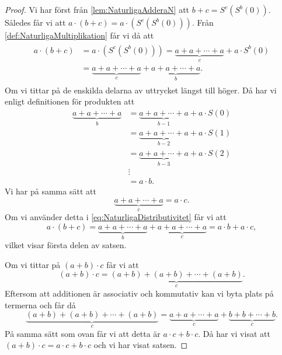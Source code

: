 \begin{proof}
  Vi har först från \cref{lem:NaturligaAdderaN} att \(b+c=S^c(S^b(0))\).
  Således får vi att \(a\cdot (b+c) = a\cdot (S^c(S^b(0)))\).
  Från \cref{def:NaturligaMultiplikation} får vi då att
  \begin{align}
    \label{eq:NaturligaDistributivitet}
    \begin{split}
      a\cdot (b+c) &= a\cdot (S^c(S^b(0))) = \underbrace{a+a+\cdots+a}_{c} +
        a\cdot S^b(0) \\
        &= \underbrace{a+a+\cdots+a}_{c}+\underbrace{a+a+\cdots+a}_{b}.
    \end{split}
  \end{align}
  Om vi tittar på de enskilda delarna av uttrycket längst till höger.
  Då har vi enligt definitionen för produkten att
  \begin{align*}
    \underbrace{a+a+\cdots+a}_{b}
      &= \underbrace{a+a+\cdots+a}_{b-1}+a\cdot S(0) \\
      &= \underbrace{a+a+\cdots+a}_{b-2}+a\cdot S(1) \\
      &= \underbrace{a+a+\cdots+a}_{b-3}+a\cdot S(2) \\
      & \vdots \\
      &= a\cdot b.
  \end{align*}
  Vi har på samma sätt att
  \begin{equation*}
    \underbrace{a+a+\cdots+a}_{c} = a\cdot c.
  \end{equation*}
  Om vi använder detta i \cref{eq:NaturligaDistributivitet} får vi att
  \begin{equation*}
    a\cdot (b+c) = \underbrace{a+a+\cdots+a}_b+\underbrace{a+a+\cdots+a}_c
      = a\cdot b + a\cdot c,
  \end{equation*}
  vilket visar första delen av satsen.

  Om vi tittar på \((a+b)\cdot c\) får vi att
  \begin{equation*}
    (a+b)\cdot c = \underbrace{(a+b)+(a+b)+\cdots+(a+b)}_c.
  \end{equation*}
  Eftersom att additionen är associativ och kommutativ kan vi byta plats
  på termerna och får då
  \begin{equation*}
    \underbrace{(a+b)+(a+b)+\cdots+(a+b)}_c =
    \underbrace{a+a+\cdots+a}_c+\underbrace{b+b+\cdots+b}_c.
  \end{equation*}
  På samma sätt som ovan får vi att detta är \(a\cdot c + b\cdot c\).
  Då har vi visat att \((a+b)\cdot c = a\cdot c + b\cdot c\) och vi har visat
  satsen.
\end{proof}

